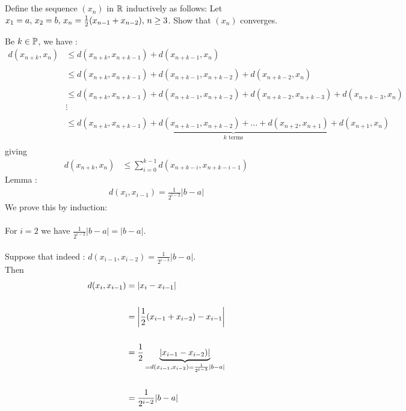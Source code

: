 \subsection{}
\begin{tcolorbox}
Define the sequence $(x_n)$ in $\mathbb{R}$ inductively as follows: Let $x_1=a,\, x_2=b,\,x_n=\frac{1}{2}(x_{n-1}+x_{n-2}),\, n\geq3$. Show that $(x_n)$ converges.
\end{tcolorbox}
Be $k\in\mathbb{P}$, we have :
\begin{align*}
d(x_{n+k}, x_{n})&\leq d(x_{n+k}, x_{n+k-1})+d( x_{n+k-1}, x_{n})\\\\
&\leq d(x_{n+k}, x_{n+k-1})+d( x_{n+k-1}, x_{n+k-2})+d( x_{n+k-2}, x_{n})\\\\
&\leq d(x_{n+k}, x_{n+k-1})+d( x_{n+k-1}, x_{n+k-2})+d( x_{n+k-2}, x_{n+k-3})+d( x_{n+k-3}, x_{n})\\
&\vdots\\\\
&\leq \underbrace{d(x_{n+k}, x_{n+k-1})+d( x_{n+k-1}, x_{n+k-2})+\dots  +d( x_{n+2}, x_{n+1})+d( x_{n+1}, x_{n})}_{k\text{ terms}}\\
\end{align*}
giving
\begin{align}
d(x_{n+k}, x_{n})&\leq \sum_{i=0}^{k-1}d(x_{n+k-i}, x_{n+k-i-1})
\end{align}
\newpage
Lemma : 
\begin{align}
d(x_{i}, x_{i-1})=\frac{1}{2^{i-2}}|b-a|
\end{align}
We prove this by induction:\\\\
For $i= 2$ we have $\frac{1}{2^{i-2}}|b-a|=|b-a|$.\\\\
Suppose that indeed : $d(x_{i-1}, x_{i-2})=\frac{1}{2^{i-3}}|b-a|$.\\
Then
\begin{align*}
d(x_{i}, x_{i-1})&=\left|x_{i}-x_{i-1}\right|\\\\
&=\left|\frac{1}{2}(x_{i-1}+x_{i-2})-x_{i-1}\right|\\\\
&=\frac{1}{2}\underbrace{\left|x_{i-1}-x_{i-2})\right|}_{= d(x_{i-1}, x_{i-2})=\frac{1}{2^{i-3}}|b-a|}\\\\
&=\frac{1}{2^{i-2}}|b-a|
\end{align*}
